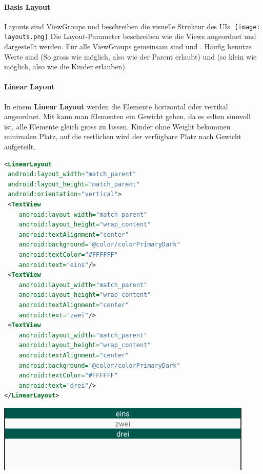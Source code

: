 \paragraph{Basis Layout} Layouts sind ViewGroups und beschreiben die visuelle Struktur des UIs.
\texttt{[image: layouts.png]}
Die Layout-Parameter beschreiben wie die Views angeordnet und dargestellt werden. Für alle ViewGroups gemeinsam sind  und . Häufig benutze Werte sind  (So gross wie möglich, also wie der Parent erlaubt) und  (so klein wie möglich, also wie die Kinder erlauben).\\

\paragraph{Linear Layout}
In einem \textbf{Linear Layout} werden die Elemente horizontal oder vertikal angeordnet. Mit  kann man Elementen ein Gewicht geben, da es selten sinnvoll ist, alle Elemente gleich gross zu lassen. Kinder ohne Weight bekommen minimalen Platz, auf die restlichen wird der verfügbare Platz nach Gewicht aufgeteilt.\\ 
\begin{lstlisting}[language=xml]
<LinearLayout 
 android:layout_width="match_parent"
 android:layout_height="match_parent"
 android:orientation="vertical">
 <TextView
    android:layout_width="match_parent"
    android:layout_height="wrap_content"
    android:textAlignment="center"
    android:background="@color/colorPrimaryDark"
    android:textColor="#FFFFFF"
    android:text="eins"/>
 <TextView
    android:layout_width="match_parent"
    android:layout_height="wrap_content"
    android:textAlignment="center"
    android:text="zwei"/>
 <TextView
    android:layout_width="match_parent"
    android:layout_height="wrap_content"
    android:textAlignment="center"
    android:background="@color/colorPrimaryDark"
    android:textColor="#FFFFFF"
    android:text="drei"/>
</LinearLayout>
\end{lstlisting}
\includegraphics[scale=0.3]{img/linearlayout_1.png} 

